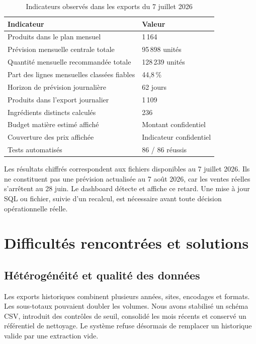 \begin{table}[H]
\centering
\caption{Indicateurs observés dans les exports du 7 juillet 2026}
\label{tab:resultats-observes}
\begin{tabularx}{\textwidth}{p{5.4cm}Y}
\toprule
\textbf{Indicateur} & \textbf{Valeur} \\
\midrule
Produits dans le plan mensuel & 1\,164 \\
Prévision mensuelle centrale totale & 95\,898 unités \\
Quantité mensuelle recommandée totale & 128\,239 unités \\
Part des lignes mensuelles classées fiables & 44,8\,\% \\
Horizon de prévision journalière & 62 jours \\
Produits dans l'export journalier & 1\,109 \\
Ingrédients distincts calculés & 236 \\
Budget matière estimé affiché & Montant confidentiel \\
Couverture des prix affichée & Indicateur confidentiel \\
Tests automatisés & 86 / 86 réussis \\
\bottomrule
\end{tabularx}
\end{table}

\begin{attentionbox}
Les résultats chiffrés correspondent aux fichiers disponibles au 7 juillet 2026.
Ils ne constituent pas une prévision actualisée au 7 août 2026, car les ventes
réelles s'arrêtent au 28 juin. Le dashboard détecte et affiche ce retard. Une
mise à jour SQL ou fichier, suivie d'un recalcul, est nécessaire avant toute
décision opérationnelle réelle.
\end{attentionbox}

\section{Difficultés rencontrées et solutions}

\subsection{Hétérogénéité et qualité des données}

Les exports historiques combinent plusieurs années, sites, encodages et formats.
Les sous-totaux pouvaient doubler les volumes. Nous avons stabilisé un schéma CSV,
introduit des contrôles de seuil, consolidé les mois récents et conservé un
référentiel de nettoyage. Le système refuse désormais de remplacer un historique
valide par une extraction vide.

